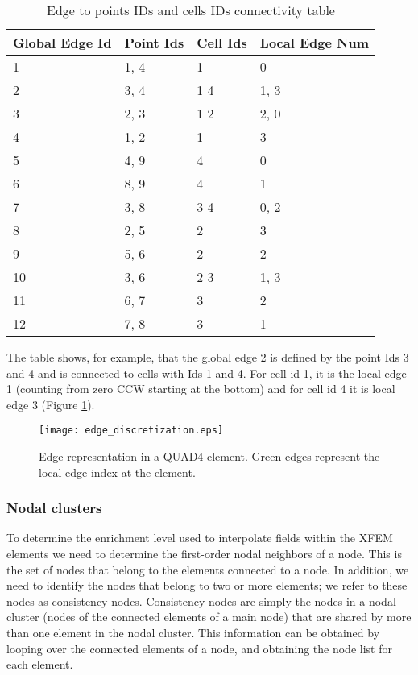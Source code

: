\begin{table}[htbp]
	\centering
		\begin{tabular}{| l | l | l | l |}
		\hline
		Global Edge Id & Point Ids & Cell Ids & Local Edge Num \\ \hline
		1  & 1, 4 & 1   & 0 	\\ \hline
		2  & 3, 4 & 1 4 & 1, 3 	\\ \hline
		3  & 2, 3 & 1 2 & 2, 0 	\\ \hline
		4  & 1, 2 & 1   & 3 	\\ \hline
		5  & 4, 9 & 4   & 0 	\\ \hline
		6  & 8, 9 & 4   & 1 	\\ \hline
		7  & 3, 8 & 3 4 & 0, 2 	\\ \hline
		8  & 2, 5 & 2   & 3 	\\ \hline
		9  & 5, 6 & 2   & 2 	\\ \hline
		10 & 3, 6 & 2 3 & 1, 3	\\ \hline
		11 & 6, 7 & 3   & 2 	\\ \hline
		12 & 7, 8 & 3   & 1 	\\ \hline
		\end{tabular}
	\caption[Edge to points and cells IDs connectivity table]{Edge to points IDs and cells IDs connectivity table}
	\label{tab:edge-table}
\end{table}

The table shows, for example, that the global edge 2 is defined by the point Ids 3 and 4 and is connected to cells with Ids 1 and 4. For cell id 1, it is the local edge 1 (counting from zero CCW starting at the bottom) and for cell id 4 it is local edge 3 (Figure \ref{fig:edge-discretization}).

\begin{figure}[htbp]
	\centering
	\texttt{[image: edge\_discretization.eps]}
	\caption[Edge discretization of XFEM model example]{Edge representation in a QUAD4 element. Green edges represent the local edge index at the element.}
	\label{fig:edge-discretization}
\end{figure}


\subsubsection{Nodal clusters}

To determine the enrichment level used to interpolate fields within the XFEM elements we need to determine the first-order nodal neighbors of a node. This is the set of nodes that belong to the elements connected to a node. In addition, we need to identify the nodes that belong to two or more elements; we refer to these nodes as consistency nodes. Consistency nodes are simply the nodes in a nodal cluster (nodes of the connected elements of a main node) that are shared by more than one element in the nodal cluster. This information can be obtained by looping over the connected elements of a node, and obtaining the node list for each element. 

